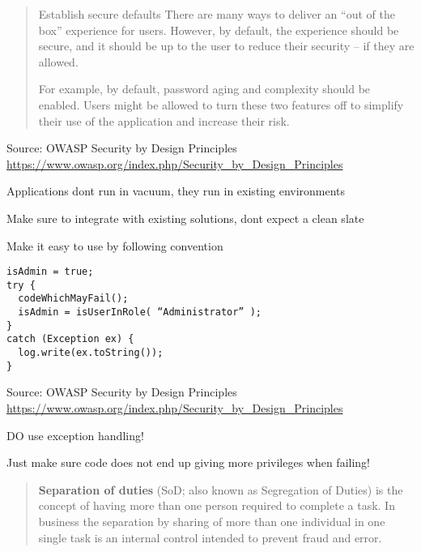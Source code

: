 \documentclass[Screen16to9,17pt]{foils}
\begin{document}

\begin{quote}
Establish secure defaults
There are many ways to deliver an “out of the box” experience for users. However, by default, the experience should be secure, and it should be up to the user to reduce their security – if they are allowed.

For example, by default, password aging and complexity should be enabled. Users might be allowed to turn these two features off to simplify their use of the application and increase their risk.
\end{quote}

Source: OWASP Security by Design Principles\\
\url{https://www.owasp.org/index.php/Security_by_Design_Principles}

\begin{list2}
\item Applications dont run in vacuum, they run in existing environments
\item Make sure to integrate with existing solutions, dont expect a clean slate
\item Make it easy to use by following convention
\end{list2}


\begin{verbatim}
isAdmin = true;
try {
  codeWhichMayFail();
  isAdmin = isUserInRole( “Administrator” );
}
catch (Exception ex) {
  log.write(ex.toString());
}
\end{verbatim}
Source: OWASP Security by Design Principles\\
\url{https://www.owasp.org/index.php/Security_by_Design_Principles}

\begin{list2}
\item DO use exception handling!
\item Just make sure code does not end up giving more privileges when failing!
\end{list2}


\begin{quote}
{\bf Separation of duties} (SoD; also known as Segregation of Duties) is the concept of having more than one person required to complete a task. In business the separation by sharing of more than one individual in one single task is an internal control intended to prevent fraud and error.
\end{quote}
\end{document}
